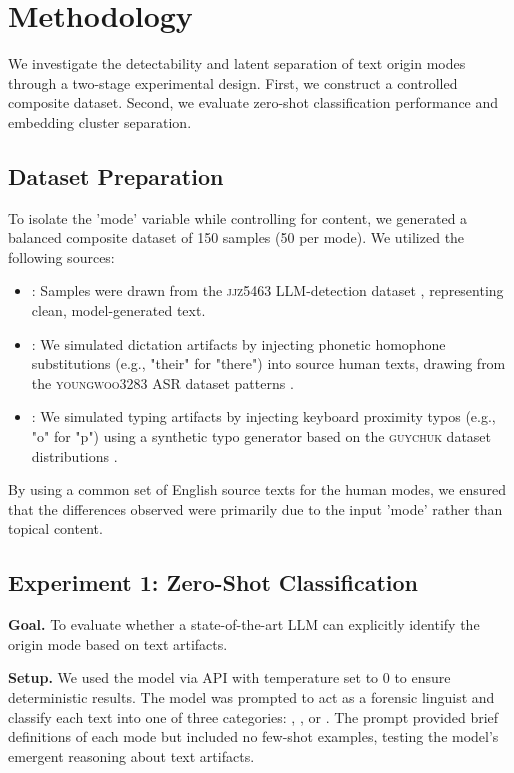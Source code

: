 \section{Methodology}
\label{sec:method}

We investigate the detectability and latent separation of text origin modes through a two-stage experimental design.
First, we construct a controlled composite dataset.
Second, we evaluate zero-shot classification performance and embedding cluster separation.

\subsection{Dataset Preparation}
\label{subsec:data}

To isolate the 'mode' variable while controlling for content, we generated a balanced composite dataset of 150 samples (50 per mode). We utilized the following sources:
\begin{itemize}[leftmargin=*]
    \item \aigen: Samples were drawn from the \textsc{jjz5463} LLM-detection dataset \cite{jjz2024llm}, representing clean, model-generated text.
    \item \dictated: We simulated dictation artifacts by injecting phonetic homophone substitutions (e.g., "their" for "there") into source human texts, drawing from the \textsc{youngwoo3283} ASR dataset patterns \cite{youngwoo2024asr}.
    \item \typed: We simulated typing artifacts by injecting keyboard proximity typos (e.g., "o" for "p") using a synthetic typo generator based on the \textsc{guychuk} dataset distributions \cite{guychuk2024typos}.
\end{itemize}
By using a common set of English source texts for the human modes, we ensured that the differences observed were primarily due to the input 'mode' rather than topical content.

\subsection{Experiment 1: Zero-Shot Classification}
\label{subsec:exp1}

{\bf Goal.} To evaluate whether a state-of-the-art LLM can explicitly identify the origin mode based on text artifacts.

{\bf Setup.} We used the \gptmini model via API with temperature set to 0 to ensure deterministic results.
The model was prompted to act as a forensic linguist and classify each text into one of three categories: \aigen, \dictated, or \typed.
The prompt provided brief definitions of each mode but included no few-shot examples, testing the model's emergent reasoning about text artifacts.

